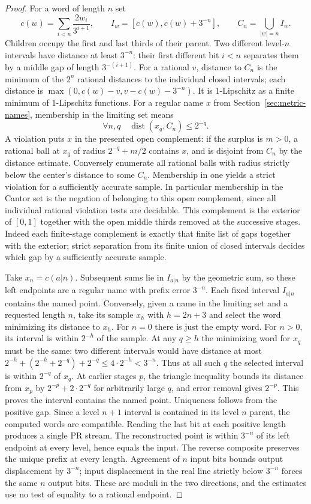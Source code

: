 \begin{proof}
For a word of length $n$ set
\[
 c(w)=\sum_{i<n}\frac{2w_i}{3^{i+1}},\qquad
 I_w=[c(w),c(w)+3^{-n}],\qquad C_n=\bigcup_{|w|=n}I_w .
\]
Children occupy the first and last thirds of their parent. Two different
level-$n$ intervals have distance at least $3^{-n}$: their first
different bit $i<n$ separates them by a middle gap of length
$3^{-(i+1)}$. For a rational $v$, distance to $C_n$ is the minimum of the
$2^n$ rational distances to the individual closed intervals; each distance
is $\max(0,c(w)-v,v-c(w)-3^{-n})$. It is 1-Lipschitz as a finite
minimum of 1-Lipschitz functions. For a regular name $x$ from
Section~\ref{sec:metric-names}, membership in the limiting set means
\[
          \forall n,q\quad \operatorname{dist}(x_q,C_n)\le 2^{-q}.
\]
A violation puts $x$ in the presented open complement: if the surplus is
$m>0$, a rational ball at $x_q$ of radius $2^{-q}+m/2$ contains $x$,
and is disjoint from $C_n$ by the distance estimate. Conversely enumerate
all rational balls with radius strictly below the center's distance to
some $C_n$. Membership in one yields a strict violation for a sufficiently
accurate sample. In particular membership in the Cantor set is the
negation of belonging to this open complement, since all individual
rational violation tests are decidable. This complement is the exterior
of $[0,1]$ together with the open middle thirds removed at the successive
stages. Indeed each finite-stage complement is exactly that finite list of
gaps together with the exterior; strict separation from its finite union
of closed intervals decides which gap by a sufficiently accurate sample.

Take $x_n=c(a|n)$. Subsequent sums lie in $I_{a|n}$ by the geometric sum,
so these left endpoints are a regular name with prefix error $3^{-n}$.
Each fixed interval $I_{a|n}$ contains the named point. Conversely,
given a name in the limiting set and a requested length $n$, take its
sample $x_h$ with $h=2n+3$ and select the word minimizing its distance
to $x_h$. For $n=0$ there is just the empty word. For $n>0$, its interval
is within $2^{-h}$ of the sample. At any $q\ge h$ the minimizing word
for $x_q$ must be the same: two different intervals would have distance
at most $2^{-h}+(2^{-h}+2^{-q})+2^{-q}\le4\cdot2^{-h}<3^{-n}$.
Thus at all such $q$ the selected interval is within $2^{-q}$ of
$x_q$. At earlier stages $p$, the triangle inequality bounds its distance
from $x_p$ by $2^{-p}+2\cdot2^{-q}$ for arbitrarily large $q$, and
error removal gives $2^{-p}$. This proves the interval contains the
named point. Uniqueness follows from the positive gap. Since a level
$n+1$ interval is contained in its level $n$ parent, the computed
words are compatible. Reading the last bit at each positive length
produces a single PR stream. The reconstructed point is within
$3^{-n}$ of its left endpoint at every level, hence equals the input.
The reverse composite preserves the unique prefix at every length.
Agreement of $n$ input bits bounds output displacement by $3^{-n}$;
input displacement in the real line strictly below $3^{-n}$ forces
the same $n$ output bits. These are moduli in the two directions,
and the estimates use no test of equality to a rational endpoint.


\end{proof}
